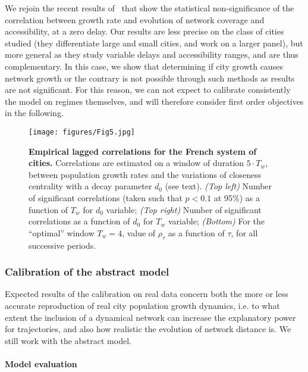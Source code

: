 \documentclass[11pt]{article}
\begin{document}
We rejoin the recent results of~\cite{mimeur:hal-01616746} that show the statistical non-significance of the correlation between growth rate and evolution of network coverage and accessibility, at a zero delay. Our results are less precise on the class of cities studied (they differentiate large and small cities, and work on a larger panel), but more general as they study variable delays and accessibility ranges, and are thus complementary. In this case, we show that determining if city growth causes network growth or the contrary is not possible through such methods as results are not significant. For this reason, we can not expect to calibrate consistently the model on regimes themselves, and will therefore consider first order objectives in the following.


\begin{figure}
	\texttt{[image: figures/Fig5.jpg]}
	\caption[Empirical lagged correlations for the French system of cities]{\textbf{Empirical lagged correlations for the French system of cities.} Correlations are estimated on a window of duration $5\cdot T_w$, between population growth rates and the variations of closeness centrality with a decay parameter $d_0$ (see text). \textit{(Top left)} Number of significant correlations (taken such that $p<0.1$ at 95\%) as a function of $T_w$ for $d_0$ variable; \textit{(Top right)} Number of significant correlations as a function of $d_0$ for $T_w$ variable; \textit{(Bottom)} For the ``optimal'' window $T_w = 4$, value of $\rho_{\tau}$ as a function of $\tau$, for all successive periods.\label{fig:macrocoevol:empirical}}
\end{figure}


\subsubsection{Calibration of the abstract model}


Expected results of the calibration on real data concern both the more or less accurate reproduction of real city population growth dynamics, i.e. to what extent the inclusion of a dynamical network can increase the explanatory power for trajectories, and also how realistic the evolution of network distance is. We still work with the abstract model.


\paragraph{Model evaluation}
\end{document}
